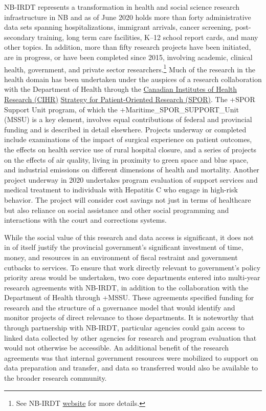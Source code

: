 \documentclass[
]{WileySix}
\begin{document}
NB-IRDT represents a transformation in health and social science research infrastructure in NB and as of June 2020 holds more than forty administrative data sets spanning hospitalizations, immigrant arrivals, cancer screening, post-secondary training, long term care facilities, K--12 school report cards, and many other topics. In addition, more than fifty research projects have been initiated, are in progress, or have been completed since 2015, involving academic, clinical health, government, and private sector researchers.\footnote{See NB-IRDT \href{https://www.unb.ca/nbirdt/}{website} for more details.} Much of the research in the health domain has been undertaken under the auspices of a research collaboration with the Department of Health through the \href{https://cihr-irsc.gc.ca/e/45859.html}{Canadian Institutes of Health Research (CIHR)} \href{http://www.spor-maritime-srap.ca/}{Strategy for Patient-Oriented Research (SPOR)}. The +SPOR\textbar{} Support Unit program, of which the +Maritime\_SPOR\_SUPPORT\_Unit\textbar{} (MSSU) is a key element, involves equal contributions of federal and provincial funding and is described in detail elsewhere. Projects underway or completed include examinations of the impact of surgical experience on patient outcomes, the effects on health service use of rural hospital closure, and a series of projects on the effects of air quality, living in proximity to green space and blue space, and industrial emissions on different dimensions of health and mortality. Another project underway in 2020 undertakes program evaluation of support services and medical treatment to individuals with Hepatitis C who engage in high-risk behavior. The project will consider cost savings not just in terms of healthcare but also reliance on social assistance and other social programming and interactions with the court and corrections systems.

While the social value of this research and data access is significant, it does not in of itself justify the provincial government's significant investment of time, money, and resources in an environment of fiscal restraint and government cutbacks to services. To ensure that work directly relevant to government's policy priority areas would be undertaken, two core departments entered into multi-year research agreements with NB-IRDT, in addition to the collaboration with the Department of Health through +MSSU\textbar. These agreements specified funding for research and the structure of a governance model that would identify and monitor projects of direct relevance to those departments. It is noteworthy that through partnership with NB-IRDT, particular agencies could gain access to linked data collected by other agencies for research and program evaluation that would not otherwise be accessible. An additional benefit of the research agreements was that internal government resources were mobilized to support on data preparation and transfer, and data so transferred would also be available to the broader research community.
\end{document}
